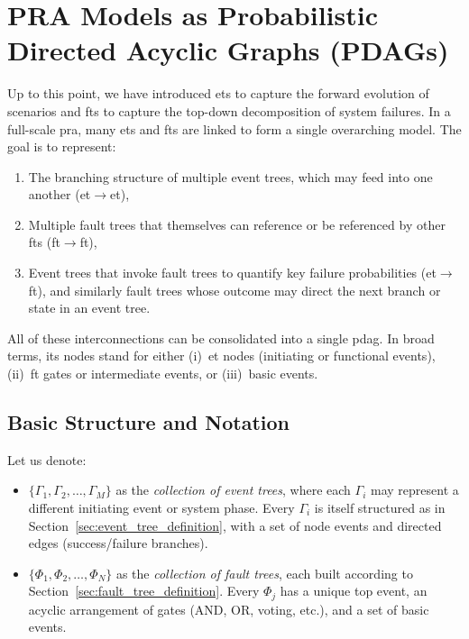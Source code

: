 \section{PRA Models as Probabilistic Directed Acyclic Graphs (PDAGs)}
\label{sec:unified_pra_dag}

Up to this point, we have introduced \acrshort{et}s to capture the forward evolution of scenarios and \acrshort{ft}s to capture the top-down decomposition of system failures. In a full-scale \acrshort{pra}, many \acrshort{et}s and \acrshort{ft}s are linked to form a single overarching model. The goal is to represent:
\begin{enumerate}
\item The branching structure of multiple event trees, which may feed into one another (\acrshort{et}\(\to\)\acrshort{et}),  
\item Multiple fault trees that themselves can reference or be referenced by other \acrshort{ft}s (\acrshort{ft}\(\to\)\acrshort{ft}),  
\item Event trees that invoke fault trees to quantify key failure probabilities (\acrshort{et}\(\to\)\acrshort{ft}), and similarly fault trees whose outcome may direct the next branch or state in an event tree.  
\end{enumerate}
All of these interconnections can be consolidated into a single \acrshort{pdag}.  In broad terms, its nodes stand for either (i)~\acrshort{et} nodes (initiating or functional events), (ii)~\acrshort{ft} gates or intermediate events, or (iii)~basic events.

\subsection{Basic Structure and Notation}
Let us denote:
\begin{itemize}
\item \(\{\Gamma_1, \Gamma_2, \dots, \Gamma_{M}\}\) as the \emph{collection of event trees}, where each \(\Gamma_{i}\) may represent a different initiating event or system phase.  Every \(\Gamma_i\) is itself structured as in Section~\ref{sec:event_tree_definition}, with a set of node events and directed edges (success/failure branches).  
\item \(\{\Phi_{1}, \Phi_{2}, \dots, \Phi_{N}\}\) as the \emph{collection of fault trees}, each built according to Section~\ref{sec:fault_tree_definition}.  Every \(\Phi_j\) has a unique top event, an acyclic arrangement of gates (AND, OR, voting, etc.), and a set of basic events.  
\end{itemize}

